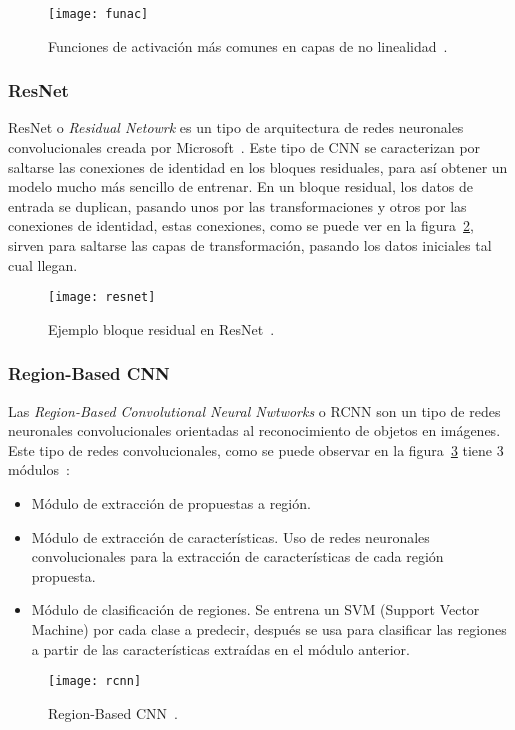 \begin{figure}[h]
	\centering
	\texttt{[image: funac]}
	\caption{Funciones de activación más comunes en capas de no linealidad~\cite{cnn}.}
	\label{fig:funac}
\end{figure}
\subsubsection{ResNet}
ResNet o \textit{Residual Netowrk} es un tipo de arquitectura de redes neuronales convolucionales creada por Microsoft~\cite{resnet}. Este tipo de CNN se caracterizan por saltarse las conexiones de identidad en los bloques residuales, para así obtener un modelo mucho más sencillo de entrenar. En un bloque residual, los datos de entrada se duplican, pasando unos por las transformaciones y otros por las conexiones de identidad, estas conexiones, como se puede ver en la figura~\ref{fig:resnet}, sirven para saltarse las capas de transformación, pasando los datos iniciales tal cual llegan.

\begin{figure}[h]
	\centering
	\texttt{[image: resnet]}
	\caption{Ejemplo bloque residual en ResNet~\cite{cnn}.}
	\label{fig:resnet}
\end{figure}
\subsubsection{Region-Based CNN}
Las \textit{Region-Based Convolutional Neural Nwtworks} o RCNN son un tipo de redes neuronales convolucionales orientadas al reconocimiento de objetos en imágenes. Este tipo de redes convolucionales, como se puede observar en la figura~\ref{fig:rcnn} tiene 3 módulos~\cite{cnn}:
\begin{itemize}
	\item Módulo de extracción de propuestas a región.
	\item Módulo de extracción de características. Uso de redes neuronales convolucionales para la extracción de características de cada región propuesta.
	\item Módulo de clasificación de regiones. Se entrena un SVM (Support Vector Machine) por cada clase a predecir, después se usa para clasificar las regiones a partir de las características extraídas en el módulo anterior.
\end{itemize}
\begin{figure}[h]
	\centering
	\texttt{[image: rcnn]}
	\caption{Region-Based CNN~\cite{cnn}.}
	\label{fig:rcnn}
\end{figure}
